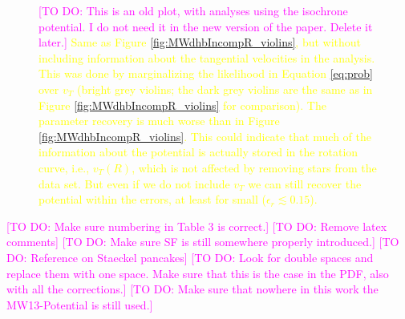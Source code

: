 \documentclass[iop,revtex4,numberedappendix,appendixfloats]{emulateapj}
\newcommand{\OLD}[1]{\textcolor{Yellow}{#1}}%
\newcommand{\Wilma}[1]{\textcolor{Magenta}{#1}}
\begin{document}
\begin{figure}[!htbp]
\begin{minipage}{0.48\textwidth}
\caption{\Wilma{[TO DO: This is an old plot, with analyses using the isochrone potential. I do not need it in the new version of the paper. Delete it later.]} \OLD{Same as Figure \ref{fig:MWdhbIncompR_violins}, but without including information about the tangential velocities in the analysis. This was done by marginalizing the likelihood in Equation \eqref{eq:prob} over $v_T$ (bright grey violins; the dark grey violins are the same as in Figure \ref{fig:MWdhbIncompR_violins} for comparison). The parameter recovery is much worse than in Figure \ref{fig:MWdhbIncompR_violins}. This could indicate that much of the information about the potential is actually stored in the rotation curve, i.e., $v_T(R)$, which is not affected by removing stars from the data set. But even if we do not include $v_T$ we can still recover the potential within the errors, at least for small ($\epsilon_r \lesssim 0.15$).}} 
\label{fig:isoSphFlexIncompR_marginal_violins}
\end{minipage}
\end{figure}


\Wilma{[TO DO: Make sure numbering in Table 3 is correct.]}
\Wilma{[TO DO: Remove latex comments]}
\Wilma{[TO DO: Make sure SF is still somewhere properly introduced.]}
\Wilma{[TO DO: Reference on Staeckel pancakes]}
\Wilma{[TO DO: Look for double spaces and replace them with one space. Make sure that this is the case in the PDF, also with all the corrections.]}
\Wilma{[TO DO: Make sure that nowhere in this work the MW13-Potential is still used.]}
\end{document}
